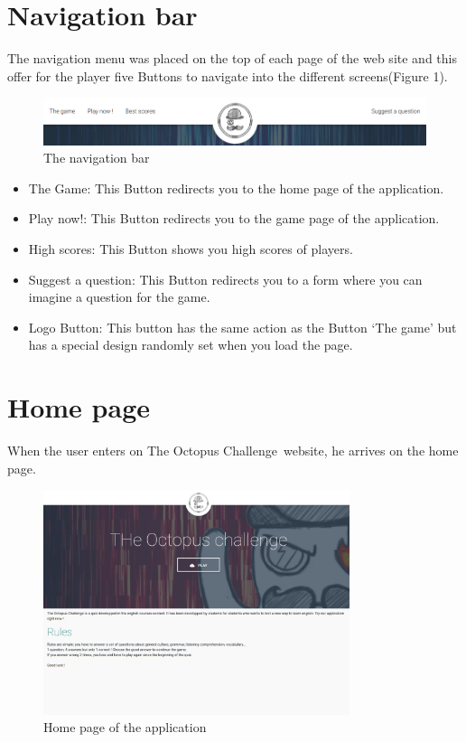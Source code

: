 \documentclass[a4paper,11pt, oneside]{book}
\def\appName{The Octopus Challenge}
\begin{document}
	\section{Navigation bar}
	The navigation menu was placed on the top of each page of the web site and this offer for the player five Buttons to navigate into the different screens(Figure 1).


	\begin{center}
		\begin{figure}
			\centering
			\includegraphics[width=1\textwidth]{CNave.png}
			\caption{The navigation bar}
		\end{figure}
	\end{center}

	\begin{itemize}
		\item The Game: This Button redirects you to the home page of the application.
		\item Play now!: This Button redirects you to the game page of the application.
		\item High scores: This Button shows you high scores of players.
		\item Suggest a question: This Button redirects you to a form where you can imagine a question for the game.
		\item Logo Button: This button has the same action as the Button ‘The game’ but has a special design randomly set when you load the page.
	\end{itemize}

	\section{Home page}
	When the user enters on \appName \ website, he arrives on the home page.

	\begin{figure} [htbp]
  	\centering
		\includegraphics[width=0.8\textwidth]{CHome.png}
		\caption{Home page of the application}
	\end{figure}
\end{document}
